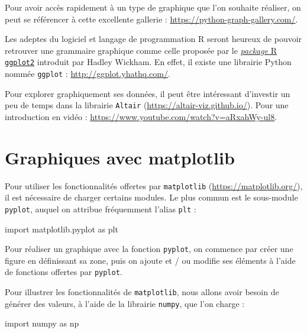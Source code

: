 \documentclass[12pt,]{book}
\newenvironment{Shaded}{\begin{snugshade}}{\end{snugshade}}
\newcommand{\ImportTok}[1]{#1}
\newcommand{\NormalTok}[1]{#1}
\numberwithin{equation}{section}
\numberwithin{countremarque}{section}
\begin{document}
Pour avoir accès rapidement à un type de graphique que l'on souhaite
réaliser, on peut se référencer à cette excellente gallerie :
\url{https://python-graph-gallery.com/}.

Les adeptes du logiciel et langage de programmation R seront heureux de
pouvoir retrouver une grammaire graphique comme celle proposée par le
\href{https://ggplot2.tidyverse.org/}{\emph{package} R \texttt{ggplot2}}
introduit par Hadley Wickham. En effet, il existe une librairie Python
nommée \texttt{ggplot} : \url{http://ggplot.yhathq.com/}.

Pour explorer graphiquement ses données, il peut être intéressant
d'investir un peu de temps dans la librairie \texttt{Altair}
(\url{https://altair-viz.github.io/}). Pour une introduction en vidéo :
\url{https://www.youtube.com/watch?v=aRxahWy-ul8}.

\section{Graphiques avec matplotlib}\label{graphiques-avec-matplotlib}

Pour utiliser les fonctionnalités offertes par \texttt{matplotlib}
(\url{https://matplotlib.org/}), il est nécessaire de charger certains
modules. Le plus commun est le sous-module \texttt{pyplot}, auquel on
attribue fréquemment l'alias \texttt{plt} :

\begin{Shaded}
\begin{Highlighting}[]
\ImportTok{import}\NormalTok{ matplotlib.pyplot }\ImportTok{as}\NormalTok{ plt}
\end{Highlighting}
\end{Shaded}

Pour réaliser un graphique avec la fonction \texttt{pyplot}, on commence
par créer une figure en définissant sa zone, puis on ajoute et / ou
modifie ses éléments à l'aide de fonctions offertes par \texttt{pyplot}.

Pour illustrer les fonctionnalités de \texttt{matplotlib}, nous allons
avoir besoin de générer des valeurs, à l'aide de la librairie
\texttt{numpy}, que l'on charge :

\begin{Shaded}
\begin{Highlighting}[]
\ImportTok{import}\NormalTok{ numpy }\ImportTok{as}\NormalTok{ np}
\end{Highlighting}
\end{Shaded}
\end{document}
